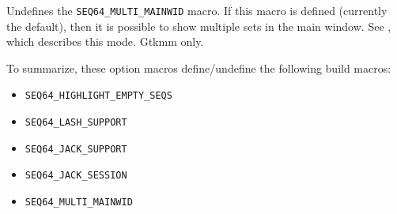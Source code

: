 %
%

        Undefines the \texttt{SEQ64\_MULTI\_MAINWID} macro.
        If this macro is defined (currently the default), then it is
        possible to show multiple sets in the main window.
        See ,
        which describes this mode.  Gtkmm only.

    To summarize, these option macros define/undefine the following build
    macros:

      \begin{itemize}
        \item \texttt{SEQ64\_HIGHLIGHT\_EMPTY\_SEQS}
        \item \texttt{SEQ64\_LASH\_SUPPORT}
        \item \texttt{SEQ64\_JACK\_SUPPORT}
        \item \texttt{SEQ64\_JACK\_SESSION}
        \item \texttt{SEQ64\_MULTI\_MAINWID}
      \end{itemize}

